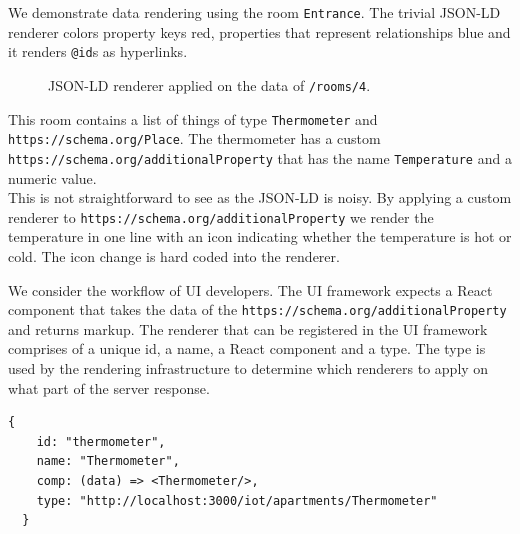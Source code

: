 We demonstrate data rendering using the room \lstinline{Entrance}. The trivial JSON-LD renderer colors property keys red, properties that represent relationships blue and it renders \lstinline{@id}s as hyperlinks.

\begin{figure}[!htb]
  \caption{JSON-LD renderer applied on the data of \lstinline{/rooms/4}.}
\end{figure}

This room contains a list of things of type \lstinline{Thermometer} and \lstinline{https://schema.org/Place}. The thermometer has a custom \lstinline{https://schema.org/additionalProperty} that has the name \lstinline{Temperature} and a numeric value. \\
This is not straightforward to see as the JSON-LD is noisy. By applying a custom renderer to \lstinline{https://schema.org/additionalProperty} we render the temperature in one line with an icon indicating whether the temperature is hot or cold. The icon change is hard coded into the renderer.

We consider the workflow of UI developers. The UI framework expects a React component that takes the data of the \lstinline{https://schema.org/additionalProperty} and returns markup. The renderer that can be registered in the UI framework comprises of a unique id, a name, a React component and a type. The type is used by the rendering infrastructure to determine which renderers to apply on what part of the server response.

\lstset{language=JSON}
\begin{lstlisting}[caption=Renderer configuration that the developer provides.]
  {
    id: "thermometer",
    name: "Thermometer",
    comp: (data) => <Thermometer/>,
    type: "http://localhost:3000/iot/apartments/Thermometer"
  }
\end{lstlisting}

